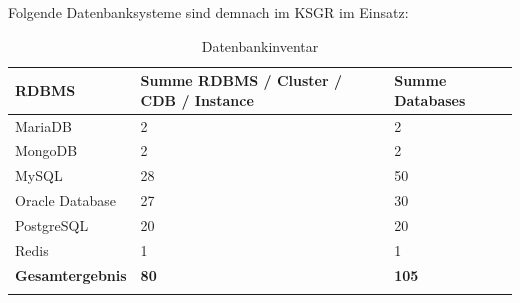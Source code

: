 Folgende Datenbanksysteme sind demnach im KSGR im Einsatz:
\begin{longtable}{@{}lll@{}}
\toprule
\textbf{\Gls{RDBMS}}                   & \textbf{Summe RDBMS / Cluster / CDB / Instance} & \textbf{Summe Databases} \\* \midrule
\endfirsthead
%
\endhead
%
\bottomrule
\endfoot
%
\endlastfoot
%
\Gls{MariaDB}                 & 2                                      & 2               \\
\Gls{MongoDB}                 & 2                                      & 2               \\
\Gls{MySQL}                   & 28                                     & 50              \\
\Gls{Oracle Database}         & 27                                     & 30              \\
\Gls{PostgreSQL}              & 20                                     & 20              \\
\Gls{Redis}                   & 1                                      & 1               \\* \midrule
\textbf{Gesamtergebnis} & \textbf{80}                            & \textbf{105}    \\* \bottomrule
\caption{Datenbankinventar}
\label{Datenbankinventar}
\end{longtable}



